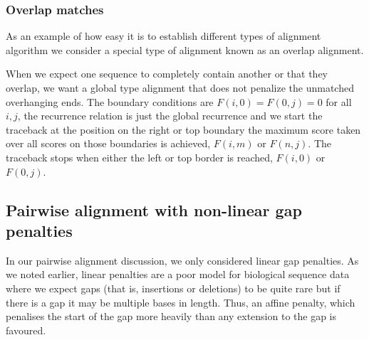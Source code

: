 \documentclass[11pt]{article}
\begin{document}
%
%

\subsubsection{Overlap matches}

As an example of how easy it is to establish different types of alignment algorithm we consider a special type of alignment known as an overlap alignment.  


When we expect one sequence to completely contain another or that they overlap, we want a global type alignment that does not penalize the unmatched overhanging ends. The boundary conditions are $F (i, 0) = F (0, j) = 0$ for all $i, j$, the recurrence relation is just the global recurrence and we start the traceback at the position on the right  or top boundary the maximum score taken over all scores on those boundaries is achieved, $F (i, m)$ or $F (n, j)$. The traceback stops when either the left or top border  is reached, $F (i, 0)$ or $F (0, j)$.


\subsection{Pairwise alignment with non-linear gap penalties }

In our pairwise alignment discussion, we only considered linear gap penalties.  As we noted earlier, linear penalties are a poor model for biological sequence data where we expect gaps (that is, insertions or deletions) to be quite rare but if there is a gap it may be multiple  bases in length.  Thus, an affine penalty, which penalises the start of the gap more heavily than any extension to the gap is favoured.
\end{document}
